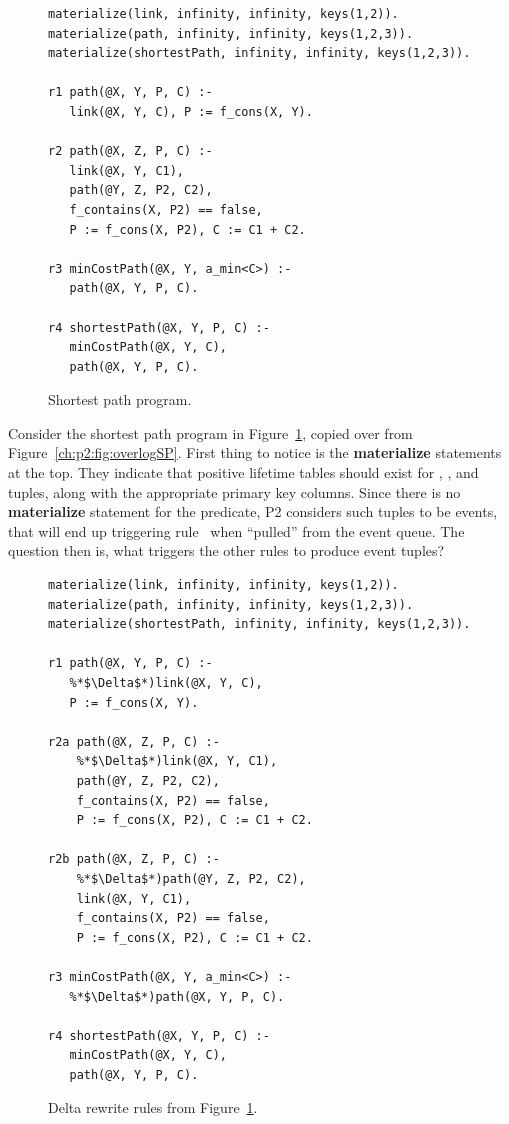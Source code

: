 \begin{figure}[!t]
\ssp
\centering
\begin{lstlisting}
materialize(link, infinity, infinity, keys(1,2)).
materialize(path, infinity, infinity, keys(1,2,3)).
materialize(shortestPath, infinity, infinity, keys(1,2,3)).
  
r1 path(@X, Y, P, C) :- 
   link(@X, Y, C), P := f_cons(X, Y).

r2 path(@X, Z, P, C) :-
   link(@X, Y, C1), 
   path(@Y, Z, P2, C2),
   f_contains(X, P2) == false,
   P := f_cons(X, P2), C := C1 + C2.

r3 minCostPath(@X, Y, a_min<C>) :-
   path(@X, Y, P, C).

r4 shortestPath(@X, Y, P, C) :-
   minCostPath(@X, Y, C), 
   path(@X, Y, P, C).

\end{lstlisting}
\caption{\label{ch:evita:fig:basicSP}Shortest path program.}
\end{figure}

Consider the shortest path program in Figure~\ref{ch:evita:fig:basicSP}, copied
over from Figure~\ref{ch:p2:fig:overlogSP}.  First thing to notice is the {\bf
materialize} statements at the top.  They indicate that positive lifetime
tables should exist for , , and  tuples,
along with the appropriate primary key columns.  Since there is no {\bf
materialize} statement for the  predicate, P2 considers such
tuples to be events, that will end up triggering rule~ when ``pulled''
from the event queue.  The question then is, what triggers the other rules to
produce  event tuples?

\begin{figure}[!t]
\ssp
\centering
\begin{lstlisting}
materialize(link, infinity, infinity, keys(1,2)).
materialize(path, infinity, infinity, keys(1,2,3)).
materialize(shortestPath, infinity, infinity, keys(1,2,3)).

r1 path(@X, Y, P, C) :-
   %*$\Delta$*)link(@X, Y, C), 
   P := f_cons(X, Y).

r2a path(@X, Z, P, C) :-
    %*$\Delta$*)link(@X, Y, C1), 
    path(@Y, Z, P2, C2),
    f_contains(X, P2) == false,
    P := f_cons(X, P2), C := C1 + C2.

r2b path(@X, Z, P, C) :-
    %*$\Delta$*)path(@Y, Z, P2, C2), 
    link(@X, Y, C1),
    f_contains(X, P2) == false,
    P := f_cons(X, P2), C := C1 + C2.

r3 minCostPath(@X, Y, a_min<C>) :-
   %*$\Delta$*)path(@X, Y, P, C).

r4 shortestPath(@X, Y, P, C) :-
   minCostPath(@X, Y, C), 
   path(@X, Y, P, C).
\end{lstlisting}
\caption{\label{ch:evita:fig:basicSPDelta}Delta rewrite rules from Figure~\ref{ch:evita:fig:basicSP}.}
\end{figure}

